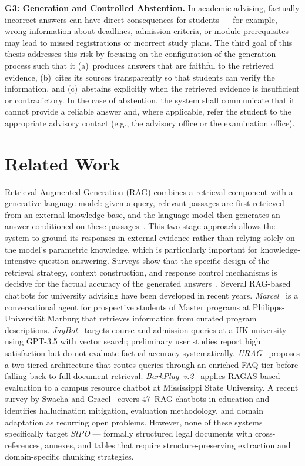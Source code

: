 \documentclass[10pt,twocolumn]{article}
\begin{document}
\medskip
\noindent\textbf{G3: Generation and Controlled Abstention.}
In academic advising, factually incorrect answers can have direct consequences for students --- for example, wrong information about deadlines, admission criteria, or module prerequisites may lead to missed registrations or incorrect study plans. The third goal of this thesis addresses this risk by focusing on the configuration of the generation process such that it (a)~produces answers that are faithful to the retrieved evidence, (b)~cites its sources transparently so that students can verify the information, and (c)~abstains explicitly when the retrieved evidence is insufficient or contradictory. In the case of abstention, the system shall communicate that it cannot provide a reliable answer and, where applicable, refer the student to the appropriate advisory contact (e.g., the advisory office or the examination office).

\section{Related Work}

Retrieval-Augmented Generation (RAG) combines a retrieval component with a generative language model: given a query, relevant passages are first retrieved from an external knowledge base, and the language model then generates an answer conditioned on these passages~\cite{lewis2021rag}. This two-stage approach allows the system to ground its responses in external evidence rather than relying solely on the model's parametric knowledge, which is particularly important for knowledge-intensive question answering. Surveys show that the specific design of the retrieval strategy, context construction, and response control mechanisms is decisive for the factual accuracy of the generated answers~\cite{gao2024ragsurvey}.
Several RAG-based chatbots for university advising have been developed in recent years. \emph{Marcel}~\cite{trienes2025marcel} is a conversational agent for prospective students of Master programs at Philipps-Universit\"at Marburg that retrieves information from curated program descriptions. \emph{JayBot}~\cite{odede2024jaybot} targets course and admission queries at a UK university using GPT-3.5 with vector search; preliminary user studies report high satisfaction but do not evaluate factual accuracy systematically. \emph{URAG}~\cite{nguyen2025urag} proposes a two-tiered architecture that routes queries through an enriched FAQ tier before falling back to full document retrieval. \emph{BarkPlug~v.2}~\cite{neupane2024barkplug} applies RAGAS-based evaluation to a campus resource chatbot at Mississippi State University. A recent survey by Swacha and Gracel~\cite{swacha2025ragsurvey} covers 47~RAG chatbots in education and identifies hallucination mitigation, evaluation methodology, and domain adaptation as recurring open problems. However, none of these systems specifically target \emph{StPO} --- formally structured legal documents with cross-references, annexes, and tables that require structure-preserving extraction and domain-specific chunking strategies.
\end{document}
